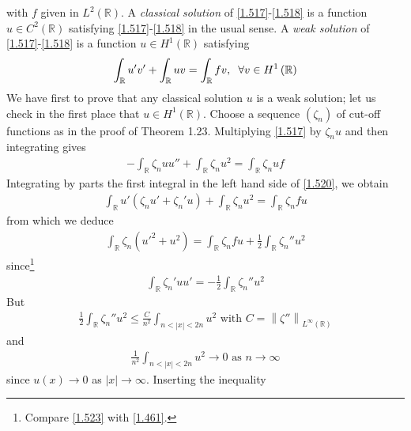 \documentclass[a4paper,oneside]{book}
\numberwithin{equation}{chapter}
\begin{document}
with $f$ given in $L^2\left(\mathbb{R}\right)$. A \textit{classical solution} of \eqref{1.517}-\eqref{1.518} is a function $u\in C^2\left(\mathbb{R}\right)$ satisfying \eqref{1.517}-\eqref{1.518} in the usual sense. A \textit{weak solution} of \eqref{1.517}-\eqref{1.518} is a function $u\in H^1\left(\mathbb{R}\right)$ satisfying
\begin{align}
\int_{\mathbb{R}} {u'v'}  + \int_{\mathbb{R}} {uv}  = \int_{\mathbb{R}} {fv} ,\hspace{0.2cm}\forall v \in {H^1}\left( \mathbb{R} \right)
\end{align}
We have first to prove that any classical solution $u$ is a weak solution; let us check in the first place that $u\in H^1\left(\mathbb{R}\right)$. Choose a sequence $\left(\zeta _n\right)$ of cut-off functions as in the proof of Theorem 1.23. Multiplying \eqref{1.517} by $\zeta _n u$ and then integrating gives
\begin{align}
\label{1.520}
 - \int_{\mathbb{R}} {{\zeta _n}uu''}  + \int_{\mathbb{R}} {{\zeta _n}{u^2}}  = \int_{\mathbb{R}} {{\zeta _n}uf} 
\end{align}
Integrating by parts the first integral in the left hand side of \eqref{1.520}, we obtain
\begin{align}
\int_{\mathbb{R}} {u'\left( {{\zeta _n}u' + {\zeta _n}'u} \right)}  + \int_{\mathbb{R}} {{\zeta _n}{u^2}}  = \int_{\mathbb{R}} {{\zeta _n}fu} 
\end{align}
from which we deduce
\begin{align}
\label{1.522}
\int_{\mathbb{R}} {{\zeta _n}\left( {u{'^2} + {u^2}} \right)}  = \int_{\mathbb{R}} {{\zeta _n}fu}  + \frac{1}{2}\int_{\mathbb{R}} {{\zeta _n}''{u^2}} 
\end{align}
since\footnote{Compare \eqref{1.523} with \eqref{1.461}.}
\begin{align}
\label{1.523}
\int_{\mathbb{R}} {{\zeta _n}'uu'}  =  - \frac{1}{2}\int_{\mathbb{R}} {{\zeta _n}''{u^2}} 
\end{align}
But
\begin{align}
\frac{1}{2}\int_{\mathbb{R}} {{\zeta _n}''{u^2}}  \le \frac{C}{{{n^2}}}\int_{n < \left| x \right| < 2n} {{u^2}} \mbox{ with } C = {\left\| {\zeta ''} \right\|_{{L^\infty }\left( \mathbb{R} \right)}}
\end{align}
and 
\begin{align}
\frac{1}{{{n^2}}}\int_{n < \left| x \right| < 2n} {{u^2}}  \to 0\mbox{ as } n \to \infty 
\end{align}
since $u\left(x\right)\to 0$ as $\left| x \right| \to \infty $. Inserting the inequality
\end{document}
